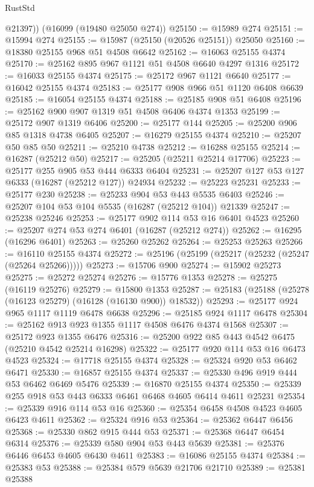\begin{lexlean}{RustStd}
\begin{coremodule}
        @21397))
    (@16099 (@19480 @25050 @274))
@25150 := @15989 @274
@25151 := @15994 @274
@25155 := @15987 (@25150 (@20526 @25151)) @25050
@25160 := @18380 @25155 @968 @51 @4508 @6642
@25162 := @16063 @25155 @4374
@25170 := @25162 @895 @967 @1121 @51 @4508 @6640 @4297 @1316
@25172 := @16033 @25155 @4374
@25175 := @25172 @967 @1121 @6640
@25177 := @16042 @25155 @4374
@25183 := @25177 @908 @966 @51 @1120 @6408 @6639
@25185 := @16054 @25155 @4374
@25188 := @25185 @908 @51 @6408
@25196 := @25162 @900 @907 @1319 @51 @4508 @6406 @4374 @1353
@25199 := @25172 @907 @1319 @6406
@25200 := @25177 @144
@25205 := @25200 @906 @85 @1318 @4738 @6405
@25207 := @16279 @25155 @4374
@25210 := @25207 @50 @85 @50
@25211 := @25210 @4738
@25212 := @16288 @25155
@25214 := @16287 (@25212 @50)
@25217 := @25205 (@25211 @25214 @17706)
@25223 := @25177 @255 @905 @53 @444 @6333 @6404
@25231 := @25207 @127 @53 @127 @6333 (@16287 (@25212 @127)) @24934
@25232 := @25223 @25231
@25233 := @25177 @230
@25238 := @25233 @904 @53 @443 @5535 @6403
@25246 := @25207 @104 @53 @104 @5535 (@16287 (@25212 @104)) @21339
@25247 := @25238 @25246
@25253 := @25177 @902 @114 @53 @16 @6401 @4523
@25260 := @25207 @274 @53 @274 @6401 (@16287 (@25212 @274))
@25262 := @16295 (@16296 @6401)
@25263 := @25260 @25262
@25264 := @25253 @25263
@25266 := @16110 @25155 @4374
@25272 := @25196 (@25199 (@25217 (@25232 (@25247 (@25264 @25266)))))
@25273 := @15706 @900
@25274 := @15902 @25273
@25275 := @25272 @25274
@25276 := @15776 @1353
@25278 := @25275 (@16119 @25276)
@25279 := @15800 @1353
@25287 := @25183 (@25188 (@25278 (@16123 @25279) (@16128 (@16130 @900)) @18532))
@25293 := @25177 @924 @965 @1117 @1119 @6478 @6638
@25296 := @25185 @924 @1117 @6478
@25304 := @25162 @913 @923 @1355 @1117 @4508 @6476 @4374 @1568
@25307 := @25172 @923 @1355 @6476
@25316 := @25200 @922 @85 @443 @4542 @6475 (@25210 @4542 @25214 @16298)
@25322 := @25177 @920 @114 @53 @16 @6473 @4523
@25324 := @17718 @25155 @4374
@25328 := @25324 @920 @53 @6462 @6471
@25330 := @16857 @25155 @4374
@25337 := @25330 @496 @919 @444 @53 @6462 @6469 @5476
@25339 := @16870 @25155 @4374
@25350 := @25339 @255 @918 @53 @443 @6333 @6461 @6468 @4605 @6414 @4611 @25231
@25354 := @25339 @916 @114 @53 @16
@25360 := @25354 @6458 @4508 @4523 @4605 @6423 @4611
@25362 := @25324 @916 @53
@25364 := @25362 @6447 @6456
@25368 := @25330 @862 @915 @444 @53
@25371 := @25368 @6447 @6454 @6314
@25376 := @25339 @580 @904 @53 @443 @5639
@25381 := @25376 @6446 @6453 @4605 @6430 @4611
@25383 := @16086 @25155 @4374
@25384 := @25383 @53
@25388 := @25384 @579 @5639 @21706 @21710
@25389 := @25381 @25388

\end{coremodule}
\end{lexlean}
